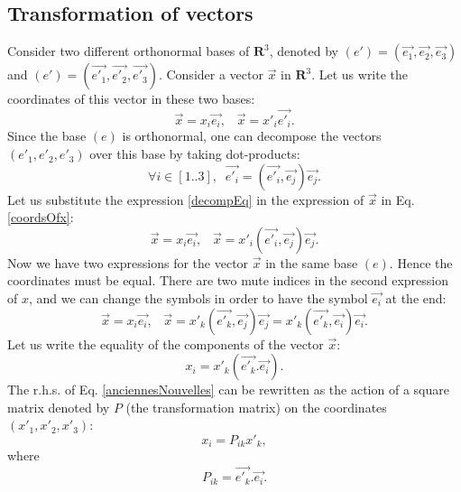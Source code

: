 \documentclass[DIV=12]{article}
\begin{document}
\subsection{Transformation of vectors}
 Consider two different orthonormal bases of ${\mathbf{R}}^3$, 
 denoted by $(e')=(\vec{e_1},\vec{e_2},\vec{e_3})$ and  $(e') = (\vec{e'_1},\vec{e'_2},\vec{e'_3})$.
 Consider a vector $\vec{x}$ in ${\mathbf{R}}^3$. Let us write the coordinates
 of this vector in these two bases:
\begin{equation}
\vec{x} = x_i\vec{e_i},\;\;\; \vec{x} = x'_i\vec{e'_i}.
\label{coordsOfx}
\end{equation}
Since the base $(e)$  is orthonormal, one can decompose the vectors
$(e'_1, e'_2,e'_3)$ over this base by taking dot-products:
\begin{equation}
\forall i \in [1..3],\;\; \vec{e'_i} = (\vec{e'_i}, \vec{e_j}) \vec{e_j}.
\label{decompEq} 
\end{equation}
 Let us substitute the expression \ref{decompEq} in the expression of 
$\vec{x}$ in Eq. \ref{coordsOfx}:
\begin{equation}
\vec{x} = x_i\vec{e_i},\;\;\; \vec{x} = x'_i (\vec{e'_i},\vec{e_j}) \vec{e_j}.
\label{coordsOfx}
\end{equation}
 Now we have two expressions for the vector $\vec{x}$
 in the same base $(e)$. Hence the coordinates must be equal.
There are two mute indices in the second expression of 
 $x$, and we can change the symbols in order to have the symbol  $\vec{e_i}$ 
 at the end:
\begin{equation}
\vec{x} = x_i\vec{e_i},\;\;\; \vec{x} = x'_k (\vec{e'_k},\vec{e_j}) \vec{e_j} =  x'_k (\vec{e'_k},\vec{e_i}) \vec{e_i}.
\label{coordsOfx}
\end{equation}
Let us write the equality of the components of the vector $\vec{x}$:
\begin{equation}
 x_i = x'_k (\vec{e'_k}.\vec{e_i}).
\label{anciennesNouvelles}
\end{equation}
 The r.h.s. of Eq. \ref{anciennesNouvelles} can be rewritten as the action
of a square matrix denoted by $P$ (the transformation matrix) on the coordinates $(x'_1,x'_2,x'_3)$:
\begin{equation}
 \boxed{x_i = P_{ik}x'_k,}
\label{anciennesNouvelles}
\end{equation}
where 
\begin{equation}
\boxed{P_{ik} = \vec{e'_k}.\vec{e_i}.}
\end{equation}
\end{document}
